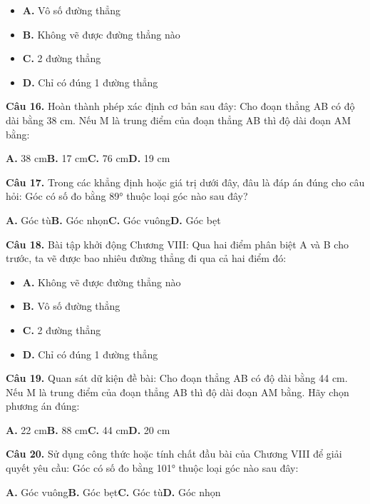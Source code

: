 \documentclass[11pt,a4paper]{article}
\begin{document}
\begin{itemize}\setlength{\itemsep}{1pt}\setlength{\parskip}{0pt}
  \item[] \textbf{A.} Vô số đường thẳng
  \item[] \textbf{B.} Không vẽ được đường thẳng nào
  \item[] \textbf{C.} 2 đường thẳng
  \item[] \textbf{D.} Chỉ có đúng 1 đường thẳng
\end{itemize}\vspace{2pt}
\textbf{\color{primary} Câu 16.} Hoàn thành phép xác định cơ bản sau đây: Cho đoạn thẳng AB có độ dài bằng 38 cm. Nếu M là trung điểm của đoạn thẳng AB thì độ dài đoạn AM bằng:\par
\hspace*{1.5em}\textbf{A.} 38 cm\quad\quad \textbf{B.} 17 cm\quad\quad \textbf{C.} 76 cm\quad\quad \textbf{D.} 19 cm\par\vspace{2pt}
\textbf{\color{primary} Câu 17.} Trong các khẳng định hoặc giá trị dưới đây, đâu là đáp án đúng cho câu hỏi: Góc có số đo bằng 89° thuộc loại góc nào sau đây?\par
\hspace*{1.5em}\textbf{A.} Góc tù\quad\quad \textbf{B.} Góc nhọn\quad\quad \textbf{C.} Góc vuông\quad\quad \textbf{D.} Góc bẹt\par\vspace{2pt}
\textbf{\color{primary} Câu 18.} Bài tập khởi động Chương VIII: Qua hai điểm phân biệt A và B cho trước, ta vẽ được bao nhiêu đường thẳng đi qua cả hai điểm đó:\par
\begin{itemize}\setlength{\itemsep}{1pt}\setlength{\parskip}{0pt}
  \item[] \textbf{A.} Không vẽ được đường thẳng nào
  \item[] \textbf{B.} Vô số đường thẳng
  \item[] \textbf{C.} 2 đường thẳng
  \item[] \textbf{D.} Chỉ có đúng 1 đường thẳng
\end{itemize}\vspace{2pt}
\textbf{\color{primary} Câu 19.} Quan sát dữ kiện đề bài: Cho đoạn thẳng AB có độ dài bằng 44 cm. Nếu M là trung điểm của đoạn thẳng AB thì độ dài đoạn AM bằng. Hãy chọn phương án đúng:\par
\hspace*{1.5em}\textbf{A.} 22 cm\quad\quad \textbf{B.} 88 cm\quad\quad \textbf{C.} 44 cm\quad\quad \textbf{D.} 20 cm\par\vspace{2pt}
\textbf{\color{primary} Câu 20.} Sử dụng công thức hoặc tính chất đầu bài của Chương VIII để giải quyết yêu cầu: Góc có số đo bằng 101° thuộc loại góc nào sau đây:\par
\hspace*{1.5em}\textbf{A.} Góc vuông\quad\quad \textbf{B.} Góc bẹt\quad\quad \textbf{C.} Góc tù\quad\quad \textbf{D.} Góc nhọn\par\vspace{2pt}
\end{document}
